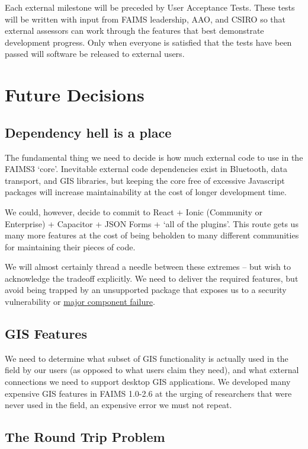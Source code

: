 \documentclass[a4paper,headings=small fontsize=10pt]{scrreprt}
\begin{document}
Each external milestone will be preceded by User Acceptance Tests. These
tests will be written with input from FAIMS leadership, AAO, and CSIRO
so that external assessors can work through the features that best
demonstrate development progress. Only when everyone is satisfied that
the tests have been passed will software be released to external users.

\chapter{Future Decisions}

\section{Dependency hell is a
place}

The fundamental thing we need to decide is how much external code to use
in the FAIMS3 `core'. Inevitable external code dependencies exist in
Bluetooth, data transport, and GIS libraries, but keeping the core free
of excessive Javascript packages will increase maintainability at the
cost of longer development time.

We could, however, decide to commit to React + Ionic (Community or
Enterprise) + Capacitor + JSON Forms + `all of the plugins'. This route
gets us many more features at the cost of being beholden to many
different communities for maintaining their pieces of code.

We will almost certainly thread a needle between these extremes -- but
wish to acknowledge the tradeoff explicitly. We need to deliver the
required features, but avoid being trapped by an unsupported package
that exposes us to a security vulnerability or
\href{https://www.theregister.com/2016/03/23/npm_left_pad_chaos/}{{major
component failure}}.

\section{GIS Features}

We need to determine what subset of GIS functionality is actually used
in the field by our users (as opposed to what users claim they need),
and what external connections we need to support desktop GIS
applications. We developed many expensive GIS features in FAIMS 1.0-2.6
at the urging of researchers that were never used in the field, an
expensive error we must not repeat.

\section{The Round Trip Problem}
\end{document}

